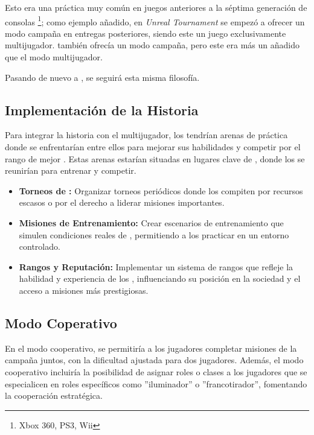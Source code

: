     Esto era una práctica muy común en juegos anteriores a la séptima generación de consolas \footnote{Xbox 360, PS3, Wii}; como ejemplo añadido, en \textit{Unreal Tournament} \cite{unrealtournament1999} se empezó a ofrecer un modo campaña en entregas posteriores, siendo este un juego exclusivamente multijugador. \cite{quake1996} también ofrecía un modo campaña, pero este era más un añadido que el modo multijugador.

    Pasando de nuevo a \gameTitle, se seguirá esta misma filosofía.
    \subsection{Implementación de la Historia}
        Para integrar la historia con el multijugador, los \hunters tendrían arenas de práctica donde se enfrentarían entre ellos para mejorar sus habilidades y competir por el rango de mejor \hunter. Estas arenas estarían situadas en lugares clave de \hole, donde los \hunters se reunirían para entrenar y competir.
        \begin{itemize}
            \item \textbf{Torneos de \hunters:} Organizar torneos periódicos donde los \hunters compiten por recursos escasos o por el derecho a liderar misiones importantes.
            \item \textbf{Misiones de Entrenamiento:} Crear escenarios de entrenamiento que simulen condiciones reales de \hole, permitiendo a los \hunters practicar en un entorno controlado.
            \item \textbf{Rangos y Reputación:} Implementar un sistema de rangos que refleje la habilidad y experiencia de los \hunters, influenciando su posición en la sociedad y el acceso a misiones más prestigiosas.
        \end{itemize}
    \subsection{Modo Coperativo}
        En el modo cooperativo, se permitiría a los jugadores completar misiones de la campaña juntos, con la dificultad ajustada para dos jugadores. Además, el modo cooperativo incluiría la posibilidad de asignar roles o clases a los jugadores que se especialicen en roles específicos como ''iluminador'' o ''francotirador'', fomentando la cooperación estratégica.
